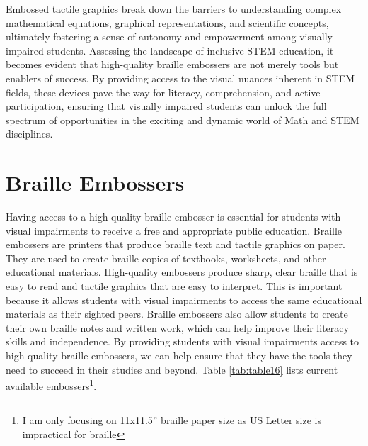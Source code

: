 \documentclass[12pt,letterpaper,twoside]{extreport}
\begin{document}
Embossed tactile graphics break down the barriers to understanding complex mathematical equations, graphical representations, and scientific concepts, ultimately fostering a sense of autonomy and empowerment among visually impaired students. Assessing the landscape of inclusive STEM education, it becomes evident that high-quality braille embossers are not merely tools but enablers of success. By providing access to the visual nuances inherent in STEM fields, these devices pave the way for literacy, comprehension, and active participation, ensuring that visually impaired students can unlock the full spectrum of opportunities in the exciting and dynamic world of Math and STEM disciplines.


\pagebreak\hypertarget{embossers}{}\section{Braille Embossers}\label{embossers}
Having access to a high-quality braille embosser is essential for students with visual impairments to receive a free and appropriate public education. Braille embossers are printers that produce braille text and tactile graphics on paper. They are used to create braille copies of textbooks, worksheets, and other educational materials. High-quality embossers produce sharp, clear braille that is easy to read and tactile graphics that are easy to interpret. This is important because it allows students with visual impairments to access the same educational materials as their sighted peers. Braille embossers also allow students to create their own braille notes and written work, which can help improve their literacy skills and independence. By providing students with visual impairments access to high-quality braille embossers, we can help ensure that they have the tools they need to succeed in their studies and beyond. Table \ref{tab:table16} lists current available embossers\footnote{\raggedright I am only focusing on 11x11.5'' braille paper size as US Letter size is impractical for braille}.
\end{document}
